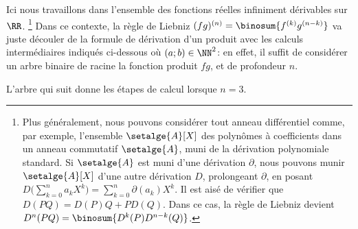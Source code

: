 Ici nous travaillons dans l'ensemble des fonctions réelles infiniment dérivables sur $\RR$.%
\footnote{
    Plus généralement, nous pouvons considérer tout anneau différentiel comme, par exemple, l'ensemble $\setalge{A}[X]$ des polynômes à coefficients dans un anneau commutatif $\setalge{A}$, muni de la dérivation polynomiale standard.
    Si $\setalge{A}$ est muni d'une dérivation $\partial$,
    nous pouvons munir $\setalge{A}[X]$ d'une autre dérivation $D$, prolongeant $\partial$, en posant
    $D \big( \sum_{k=0}^n a_k X^k \big) = \sum_{k=0}^n \partial(a_k) X^k$.
    Il est aisé de vérifier que $D(PQ) = D(P) Q + P D(Q)$.
    Dans ce cas, la règle de Liebniz devient $D^n(PQ) = \binosum{D^k(P) D^{n-k}(Q)}$.
}
Dans ce contexte,
la règle de Liebniz $(fg)^{(n)} = \binosum{f^{(k)} g^{(n-k)}}$ va juste découler de la formule de dérivation d'un produit avec les calculs intermédiaires indiqués ci-dessous où $(a;b) \in \NN^2$:
en effet,
il suffit de considérer un arbre binaire de racine la fonction produit $f g$, et de profondeur $n$.

%
            {\intertree}{\prodder}


L'arbre qui suit donne les étapes de calcul lorsque $n=3$.

\binotree{\prodder}
